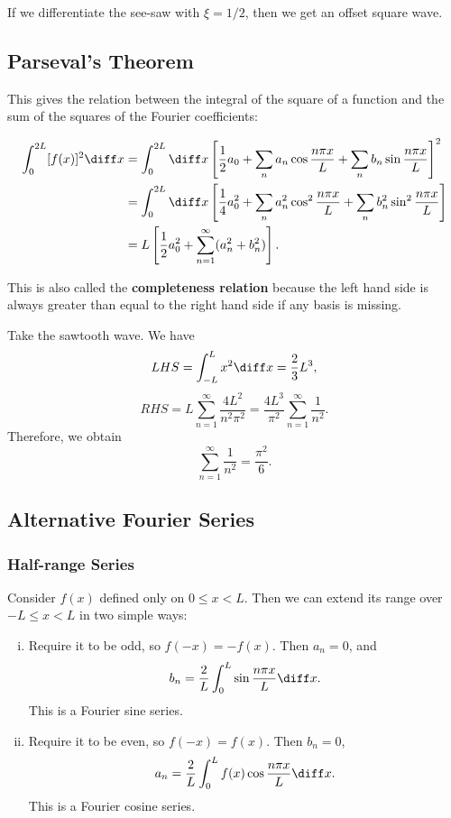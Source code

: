 \documentclass[12pt]{article}
\begin{document}
\begin{exbox}
	If we differentiate the see-saw with $\xi = 1/2$, then we get an offset square wave.
\end{exbox}

\subsection{Parseval's Theorem}%
\label{sub:parseval_s_theorem}

This gives the relation between the integral of the square of a function and the sum of the squares of the Fourier coefficients:

\begin{align*}
	\int_{0}^{2L}[f(x)]^2\diff x &= \int_{0}^{2L}\diff x \left[ \frac{1}{2} a_0 + \sum_{n}a_n \cos \frac{n \pi x}{L} + \sum_{n}b_n \sin \frac{n \pi x}{L} \right]^2 \\
				   &= \int_{0}^{2L}\diff x \left[ \frac{1}{4} a_0^2 + \sum_{n} a_n^2 \cos^2 \frac{n \pi x}{L} + \sum_{n} b_n^2 \sin^2 \frac{n \pi x}{L} \right]\\
				   &= L \left[ \frac{1}{2} a_0^2 + \sum_{n = 1}^{\infty} (a_n^2 + b_n^2) \right].
\end{align*}

This is also called the \textbf{completeness relation} because the left hand side is always greater than equal to the right hand side if any basis is missing.

\begin{exbox}
	Take the sawtooth wave. We have
	\[
	LHS = \int_{-L}^{L} x^2\diff x = \frac{2}{3}L^3
	,\]
	\[
	RHS = L \sum_{n = 1}^{\infty} \frac{4L^2}{n^2 \pi^2} = \frac{4L^3}{\pi ^2}\sum_{n = 1}^{\infty} \frac{1}{n^2}
	.\]
	Therefore, we obtain
	\[
	\sum_{n = 1}^{\infty} \frac{1}{n^2} = \frac{\pi^2}{6}
	.\]
\end{exbox}

\subsection{Alternative Fourier Series}%
\label{sub:alternative_fourier_series}

\subsubsection{Half-range Series}%
\label{subsub:half_range_series}

Consider $f(x)$ defined only on $0 \leq x < L$. Then we can extend its range over $- L \leq x < L$ in two simple ways:
\begin{enumerate}[(i)]
	\item Require it to be odd, so $f(-x) = -f(x)$. Then $a_n = 0$, and
		\[
			b_n = \frac{2}{L} \int_{0}^{L} \sin \frac{n \pi x}{L}\diff x
		.\]
		This is a Fourier sine series.
	\item Require it to be even, so $f(-x) = f(x)$. Then $b_n = 0$,
		\[
			a_n = \frac{2}{L} \int_{0}^{L}f(x) \cos \frac{n \pi x}{L}\diff x
		.\]
		This is a Fourier cosine series.
\end{enumerate}
\end{document}
